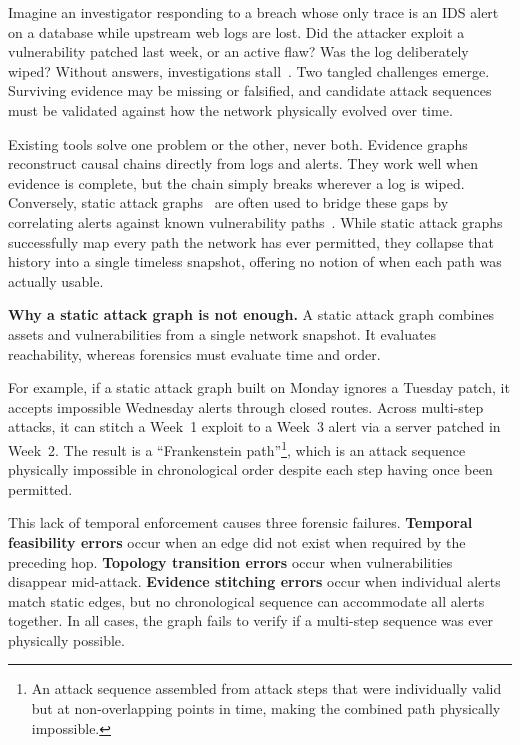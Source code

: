 \documentclass[12pt]{article}
\begin{document}
Imagine an investigator responding to a breach whose only trace is an IDS alert on a database while upstream web logs are lost. Did the attacker exploit a vulnerability patched last week, or an active flaw? Was the log deliberately wiped? Without answers, investigations stall~\cite{khan2022digital}. Two tangled challenges emerge. Surviving evidence may be missing or falsified, and candidate attack sequences must be validated against how the network physically evolved over time.

Existing tools solve one problem or the other, never both. Evidence graphs~\cite{wang2008evidence} reconstruct causal chains directly from logs and alerts. They work well when evidence is complete, but the chain simply breaks wherever a log is wiped. Conversely, static attack graphs~\cite{1004377,Lallie2020} are often used to bridge these gaps by correlating alerts against known vulnerability paths~\cite{10.1145/586110.586144,ning2004building}. While static attack graphs successfully map every path the network has ever permitted, they collapse that history into a single timeless snapshot, offering no notion of when each path was actually usable.

\textbf{Why a static attack graph is not enough.} A static attack graph combines assets and vulnerabilities from a single network snapshot. It evaluates reachability, whereas forensics must evaluate time and order.

For example, if a static attack graph built on Monday ignores a Tuesday patch, it accepts impossible Wednesday alerts through closed routes. Across multi-step attacks, it can stitch a Week~1 exploit to a Week~3 alert via a server patched in Week~2. The result is a ``Frankenstein path''\footnote{An attack sequence assembled from attack steps that were individually valid but at non-overlapping points in time, making the combined path physically impossible.}, which is an attack sequence physically impossible in chronological order despite each step having once been permitted.

This lack of temporal enforcement causes three forensic failures. \textbf{Temporal feasibility errors} occur when an edge did not exist when required by the preceding hop. \textbf{Topology transition errors} occur when vulnerabilities disappear mid-attack. \textbf{Evidence stitching errors} occur when individual alerts match static edges, but no chronological sequence can accommodate all alerts together. In all cases, the graph fails to verify if a multi-step sequence was ever physically possible.
\end{document}
